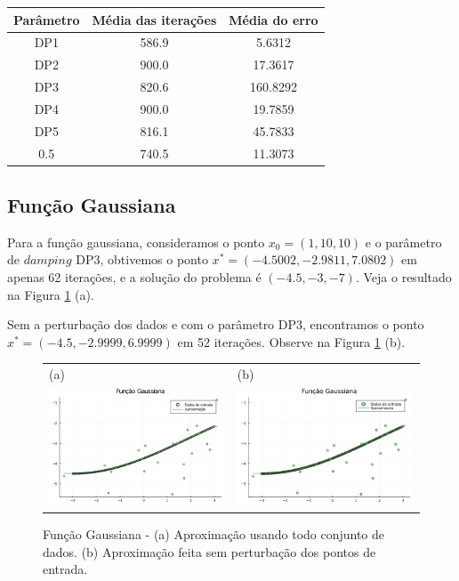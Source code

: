\documentclass[12pt,a4paper]{article}
\begin{document}
	\begin{table}[H]
		\centering
		\begin{tabular}{|c|c|c|}
			\hline
			Parâmetro & Média das iterações & Média do erro\\
			\hline
			
			DP1 & 586.9 & 5.6312\\
			\hline
			DP2 & 900.0 & 17.3617\\ \hline
			DP3 & 820.6 & 160.8292\\ \hline
			DP4 & 900.0 & 19.7859\\ \hline
			DP5 & 816.1 & 45.7833\\ \hline
			0.5 & 740.5 & 11.3073\\		\hline	
			
		\end{tabular}
	\end{table}

	\subsection{Função Gaussiana} \label{gau}
	Para a função gaussiana, consideramos o ponto $x_0 = (1, 10, 10)$ e o parâmetro de $damping$ DP3, obtivemos o ponto $x^* = (-4.5002, -2.9811,7.0802)$ em apenas 62 iterações, e a solução do problema é $(-4.5, -3, -7).$ Veja o resultado na Figura \ref{fig4} (a).
	
	Sem a perturbação dos dados e com o parâmetro DP3, encontramos o ponto $x^* = (-4.5,-2.9999, 6.9999)$ em 52 iterações. Observe na Figura \ref{fig4} (b).
	
	\begin{figure}[H]
		\centering 
		\begin{tabular}{ll}
			
			(a)& (b)   \\
			
			\includegraphics[width=0.45\linewidth]{7.png} & \includegraphics[width=0.45\linewidth]{8.png}\\ 
			
		\end{tabular}
		\caption{Função Gaussiana - (a) Aproximação usando todo conjunto de dados. (b) Aproximação feita sem perturbação dos pontos de entrada.}
		\label{fig4}
	\end{figure}
	
\end{document}

